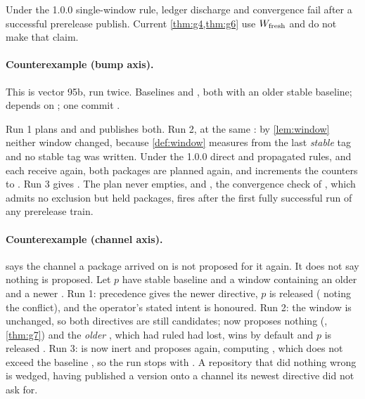 \begin{obligation}
\label{ob:pre}
Under the 1.0.0 single-window rule, ledger discharge and convergence fail after a successful prerelease publish. Current \cref{thm:g4,thm:g6} use $W_{\rm fresh}$ and do not make that claim.
\end{obligation}

\paragraph{Counterexample (bump axis).}
This is \SPEC{} vector 95b, run twice. Baselines
 and , both with an older stable
baseline;  depends on ; one commit
.

Run 1 plans  and  and publishes
both. Run 2, at the same \Head{}: by \cref{lem:window} neither window changed,
because \cref{def:window} measures from the last \emph{stable} tag and no
stable tag was written. Under the 1.0.0 direct and propagated rules,  and  each receive \bpatch{} again, both packages are planned again, and
 increments the counters to . Run 3 gives
. The plan never empties, and , the convergence
check of , which admits no exclusion but held packages, fires
after the first fully successful run of any prerelease train.

\paragraph{Counterexample (channel axis).}
 says the channel a package arrived on is not proposed for it
again. It does not say nothing is proposed. Let $p$ have stable baseline
 and a window containing an older  and a
newer . Run 1:  precedence gives the newer
directive, $p$ is released  ( noting the
conflict), and the operator's stated intent is honoured. Run 2: the window is
unchanged, so both directives are still candidates;  now proposes
nothing (, \cref{thm:g7}) and the \emph{older} ,
which  had ruled had lost, wins by default and $p$ is released
. Run 3:  is now inert and  proposes
 again, computing , which does not exceed the
baseline , so the run stops with . A repository
that did nothing wrong is wedged, having published a version onto a channel its
newest directive did not ask for.

